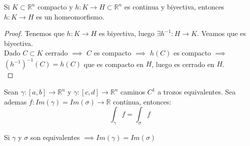 \begin{observación}
Si $K\subset \mathbb{R}^n$ compacto y $h:K \to H\subset \mathbb{R}^n$ es continua y biyectiva, entonces $h:K \to H$ es un homeomorfismo.
\end{observación}

\begin{proof}
    Tenemos que $h:K \to H$ es biyectiva, luego $\exists h^{-1}:H \to K$. Veamos que es biyectiva. \\
    Dado $C \subset K$ cerrado $\implies$ $C$ es compacto $\implies$ $h(C)$ es compacto $\implies$ $(h^{-1})^{-1}(C)=h(C)$ que es compacto en $H$, luego es cerrado en $H$. \\
\end{proof}

\begin{teorema}
    Sean $\gamma: [a,b] \to \mathbb{R}^n$ y $\gamma:[c,d] \to \mathbb{R}^n$ caminos $C^1$ a trozos equivalentes. Sea ademas $f:Im(\gamma)=Im(\sigma) \to \mathbb{R}$ continua, entonces: \\
    $$\int_{\gamma}f=\int_{\sigma}f$$
\end{teorema}

\begin{observación}
Si $\gamma$ y $\sigma$ son equivalentes $\implies Im(\gamma)=Im(\sigma)$
\end{observación}

